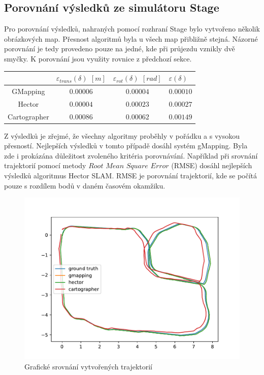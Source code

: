 \documentclass[12pt]{report}
\begin{document}
\subsection{Porovnání výsledků ze simulátoru Stage}
Pro porovnání výsledků, nahraných pomocí rozhraní Stage bylo vytvořeno několik obrázkových map. Přesnost algoritmů byla u všech map přibližně stejná. Názorné porovnání je tedy provedeno pouze na jedné, kde při průjezdu vznikly dvě smyčky. K porovnání jsou využity rovnice z předchozí sekce.\\
\begin{center}
	\begin{tabular}{c|ccp{3cm}}
		\bfseries \bfseries  & $\varepsilon_{trans}(\delta)$ $[m]$ & $\varepsilon_{rot}(\delta)$ $[rad]$ & $\varepsilon(\delta)$  \\ [2mm]
		\hline
		GMapping & $0.00006$ & $0.00004$ & $0.00010$  \\ 
		Hector & $0.00004$ & $0.00023$ & $0.00027$  \\ 
		Cartographer & $0.00086$ & $0.00062$ & $0.00149$  \\
	\end{tabular}
\end{center}

Z výsledků je zřejmé, že všechny algoritmy proběhly v pořádku a s vysokou přesností. Nejlepších výsledků v tomto případě dosáhl systém gMapping. Byla zde i prokázána důležitost zvoleného kritéria porovnávání. Například při srovnání trajektorií pomocí metody $Root$ $Mean$ $Square$ $Error$ (RMSE) dosáhl nejlepších výsledků algoritmus Hector SLAM. RMSE je porovnání trajektorií, kde se počítá pouze s rozdílem bodů v daném časovém okamžiku. 

\begin{figure}[!ht]
	\begin{center}
		\includegraphics[width=0.7\columnwidth]{imgs/stage_trajectories.pdf}
	\end{center}
	\caption{Grafické srovnání vytvořených trajektorií}
	\label{fig:stage_trajectories}
\end{figure}
\end{document}

